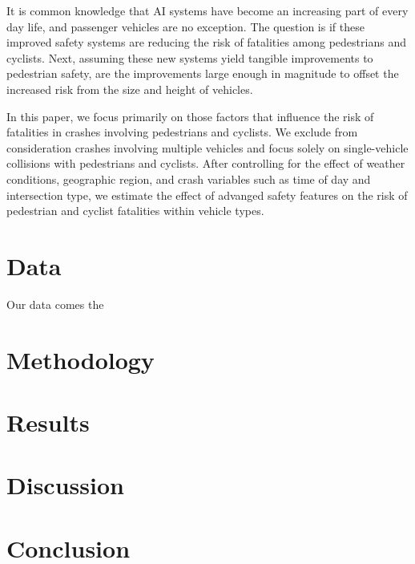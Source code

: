 \documentclass[12pt]{article}
\begin{document}
It is common knowledge that AI systems have become an increasing part of every day life, and passenger
vehicles are no exception. The question is if these improved safety systems are reducing the risk of fatalities
among pedestrians and cyclists. Next, assuming these new systems yield tangible improvements to pedestrian safety,
are the improvements large enough in magnitude to offset the increased risk from the size and height of vehicles.

In this paper, we focus primarily on those factors that influence the risk of fatalities in crashes involving pedestrians
and cyclists. We exclude from consideration crashes involving multiple vehicles and focus solely on single-vehicle 
collisions with pedestrians and cyclists. After controlling for the effect of weather conditions,
geographic region, and crash variables such as time of day and intersection type, we estimate the effect
of advanged safety features on the risk of pedestrian and cyclist fatalities within vehicle types.


\section{Data}

Our data comes the 

\section{Methodology}

\section{Results}


\section{Discussion}

\section{Conclusion}

\printbibliography
\end{document}
